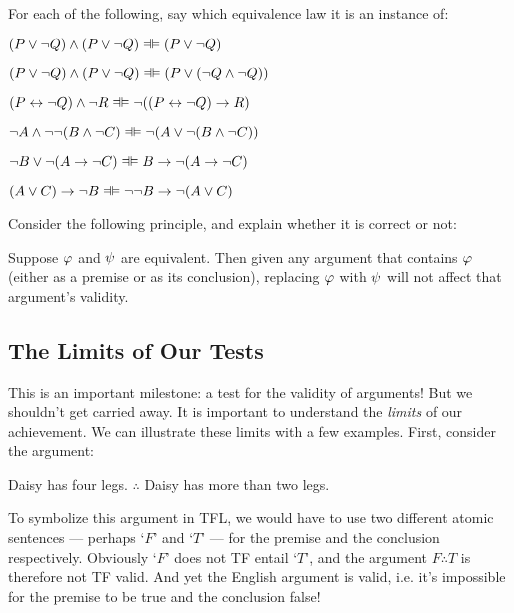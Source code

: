 \noindent For each of the following, say which equivalence law it is an instance of:

\begin{earg}
\item $(P \eor \enot Q) \land (P \eor \enot Q) \lequiv (P \lor \lnot Q)$
\item $(P \eor \enot Q) \land (P \eor \enot Q) \lequiv (P \lor (\lnot Q \land \lnot Q))$
\item $(P \leftrightarrow \lnot Q) \land \lnot R \lequiv \lnot((P \leftrightarrow \lnot Q) \rightarrow R)$ 
\item $\lnot A \land \lnot \lnot (B \land \lnot C) \lequiv \enot(A \eor \enot (B \eand  \enot C))$ 
\item $\enot B \eor \enot (A \eif \enot C) \lequiv B \rightarrow \lnot (A \rightarrow \lnot C)$
\item $(A \eor C) \eif \enot B \lequiv \lnot \lnot B \rightarrow \lnot (A \lor C)$

\end{earg}



\problempart
Consider the following principle, and explain whether it is correct or not:
	\begin{ebullet}
		\item Suppose $\mathcal{\varphi}$ and $\mathcal{\psi}$ are equivalent. Then given any argument that contains $\mathcal{\varphi}$ (either as a premise or as its conclusion), replacing $\mathcal{\varphi}$ with $\mathcal{\psi}$  will not affect that argument's validity.
	\end{ebullet}


\subsection{The Limits of Our Tests}\label{s:TFTestLimits}

This is an important milestone: a test for the validity of arguments! But we shouldn't get carried away.  It is important to understand the \emph{limits} of our achievement. We can illustrate these limits with a few examples.  First, consider the argument:
	\begin{earg}
	\setcounter{eargnum}{0}
		\item Daisy has four legs. $\therefore$ Daisy has more than two legs.
	\end{earg}
To symbolize this argument in TFL, we would have to use two different atomic sentences --- perhaps `$F$'  and `$T$' --- for the premise and the conclusion respectively. Obviously `$F$' does not TF entail `$T$', and the argument $F \therefore T$ is therefore not TF valid.  And yet the English argument is valid, i.e. it's impossible for the premise to be true and the conclusion false!

